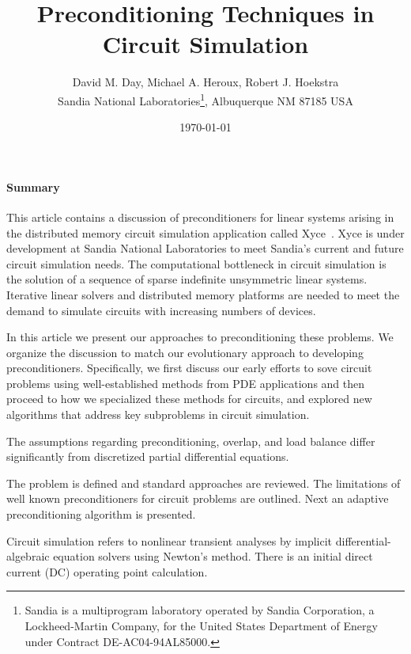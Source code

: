 \documentclass[10pt,fleqn]{article}
\begin{document}
%
%
\title{Preconditioning Techniques in Circuit Simulation}

\author{David M. Day, Michael A. Heroux, Robert J. Hoekstra \\
Sandia National Laboratories\footnote{
Sandia is a multiprogram laboratory operated by Sandia Corporation, a
Lockheed-Martin Company, for the United States Department of Energy
under Contract DE-AC04-94AL85000.}, Albuquerque NM 87185 USA}

\date{\today}

\maketitle

\paragraph{Summary}
This article contains a discussion of
preconditioners for linear systems arising in the 
distributed memory circuit simulation application called
Xyce~\cite{Xyce}. Xyce is under development at Sandia National Laboratories to
meet Sandia's current and future circuit simulation needs.
The computational bottleneck in circuit simulation is the
solution of a sequence of sparse indefinite unsymmetric linear systems.
Iterative linear solvers and distributed memory platforms
are needed to meet the demand to simulate circuits with increasing
numbers of devices.  

In this article we present our approaches to
preconditioning these problems.  We organize the discussion to match
our evolutionary approach to developing preconditioners.
Specifically, we first discuss our early efforts to sove circuit problems
using well-established methods from PDE applications and then proceed
to how we specialized these methods for circuits, and explored
new algorithms that address key subproblems in circuit simulation.

The assumptions regarding preconditioning,
overlap, and load balance differ significantly from discretized
partial differential equations.

The problem is defined and standard approaches are reviewed.  The
limitations of well known preconditioners for circuit problems are
outlined.  Next an adaptive preconditioning algorithm is presented.

Circuit simulation refers to nonlinear transient analyses by implicit
differential-algebraic equation solvers using Newton's method.
There is an initial direct current (DC) operating point calculation.
\end{document}
